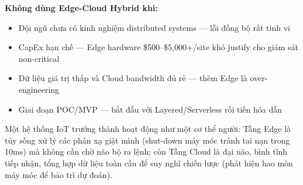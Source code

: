 \noindent\textbf{Không dùng Edge-Cloud Hybrid khi:}
\begin{itemize}
    \item Đội ngũ chưa có kinh nghiệm distributed systems --- lỗi đồng bộ rất tinh vi
    \item CapEx hạn chế --- Edge hardware \$500--\$5,000+/site khó justify cho giám sát non-critical
    \item Dữ liệu giá trị thấp và Cloud bandwidth đủ rẻ --- thêm Edge là over-engineering
    \item Giai đoạn POC/MVP --- bắt đầu với Layered/Serverless rồi tiến hóa dần
\end{itemize}

Một hệ thống IoT trưởng thành hoạt động như một cơ thể người: Tầng Edge là tủy sống xử lý các phản xạ giật mình (shut-down máy móc tránh tai nạn trong 10ms) mà không cần chờ não bộ ra lệnh; còn Tầng Cloud là đại não, bình tĩnh tiếp nhận, tổng hợp dữ liệu toàn cầu để suy nghĩ chiến lược (phát hiện hao mòn máy móc để bảo trì dự đoán).
